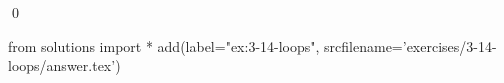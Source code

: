 
\begin{ex}
  \label{ex:3-14-loops}
  
  \qed
\end{ex}
\begin{python0}
from solutions import *
add(label="ex:3-14-loops",
    srcfilename='exercises/3-14-loops/answer.tex')
\end{python0}

